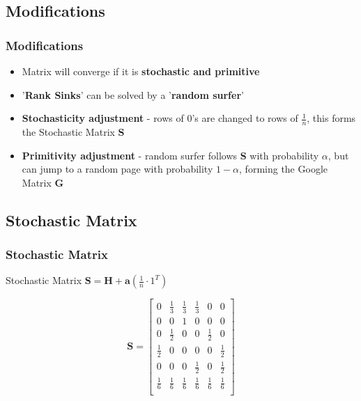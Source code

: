 \documentclass{beamer}
\begin{document}
\subsection{Modifications}
\begin{frame}
\frametitle{Modifications}
\begin{itemize}
\item Matrix will converge if it is \textbf{stochastic and primitive}
\item '\textbf{Rank Sinks}' can be solved by a '\textbf{random surfer}'
\item \textbf{Stochasticity adjustment} - rows of 0's are changed to rows of \(\frac{1}{n}\), this forms the Stochastic Matrix \textbf{S}
\item \textbf{Primitivity adjustment} - random surfer follows \textbf{S} with probability \(\alpha\), but can jump to a random page with probability \(1-\alpha\), forming the Google Matrix \textbf{G}
\end{itemize}

\end{frame}

\subsection{Stochastic Matrix}
\begin{frame}
\frametitle{Stochastic Matrix}
\begin{block}{Stochastic Matrix}
$\textbf{S} = \textbf{H} + \textbf{a}(\frac{1}{n}\cdot 1^{T} )$
\end{block}
\begin{example}
\[\textbf{S}=\left[
\begin{array}{cccccc}
0 & \frac{1}{3} & \frac{1}{3} &\frac{1}{3} & 0& 0 \\
0 & 0 & 1 & 0 & 0 & 0\\
0 & \frac{1}{2} & 0 & 0 & \frac{1}{2} & 0\\
\frac{1}{2} & 0 & 0 & 0 & 0 & \frac{1}{2}\\
0 & 0 & 0 & \frac{1}{2} & 0 &\frac{1}{2} \\
\frac{1}{6} & \frac{1}{6} & \frac{1}{6} & \frac{1}{6} & \frac{1}{6} & \frac{1}{6} \\
\end{array}
\right]	
\]
\end{example}
\end{frame}
\end{document}
